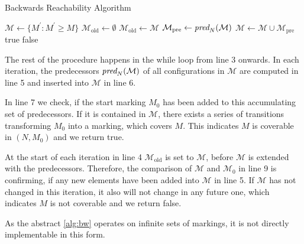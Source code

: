 \begin{algorithm}[htb]
\caption{Backwards Reachability Algorithm}\label{alg:bw}
\begin{algorithmic}[1]
\State $\mathcal{M} \gets \{ M^{'} : M^{'} \ge M \}$
\State $\mathcal{M}_{\text{old}} \gets \emptyset$
	\State $\mathcal{M}_{\text{old}} \gets \mathcal{M}$
	\State $\mathcal{M}_{\text{pre}} \gets \operatorname{\textit{pred}}_{N}(\mathcal{M})$
	\State $\mathcal{M} \gets \mathcal{M}  \cup \mathcal{M}_{\text{pre}}$
	\Return true
\EndIf
{}
    \Return false
\EndIf
\EndWhile
\end{algorithmic}
\end{algorithm}

The rest of the procedure happens in the while loop from line 3 onwards. In each iteration, the predecessors $\operatorname{\textit{pred}}_{N}(\mathcal{M})$ of all configurations in $\mathcal{M}$ are computed in line 5 and inserted into $\mathcal{M}$ in line 6. 
\par
In line 7 we check, if the start marking $M_{0}$ has been added to this accumulating set of predecessors. If it is contained in $\mathcal{M}$, there exists a series of transitions transforming $M_{0}$ into a marking, which covers $M$. This indicates $M$ is coverable in $(N,M_{0})$ and we return true. 
\par
At the start of each iteration in line 4 $\mathcal{M}_{\text{old}}$ is set to $\mathcal{M}$, before $\mathcal{M}$ is extended with the predecessors. Therefore, the comparison of $\mathcal{M}$ and $\mathcal{M}_{0}$ in line 9 is confirming, if any new elements have been added into $\mathcal{M}$ in line 5. If $\mathcal{M}$ has not changed in this iteration, it also will not change in any future one, which indicates $M$ is not coverable and we return false.
\par
As the abstract \autoref{alg:bw} operates on infinite sets of markings, it is not directly implementable in this form. 

